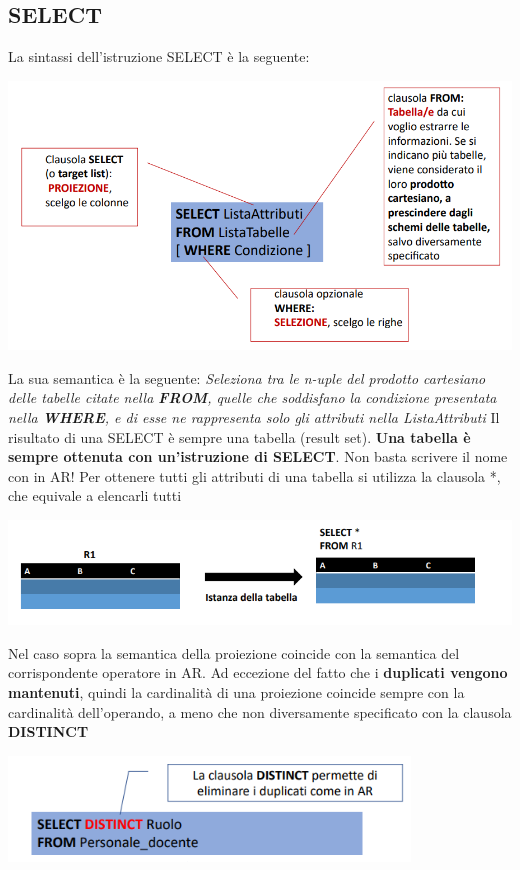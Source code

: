 \documentclass[12pt]{article}
\begin{document}
\subsection{SELECT}
La sintassi dell'istruzione SELECT è la seguente:
\begin{center}
    \includegraphics[width = 1\textwidth]{Images/168.PNG}
\end{center}
La sua semantica è la seguente: \textit{Seleziona tra le n-uple del prodotto cartesiano delle tabelle citate nella \textbf{FROM}, quelle che soddisfano la condizione presentata nella \textbf{WHERE}, e di esse ne rappresenta solo gli attributi nella \textit{ListaAttributi}}
Il risultato di una SELECT è sempre una tabella (result set).
\textbf{Una tabella è sempre ottenuta con un'istruzione di SELECT}. Non basta scrivere il nome con in AR!
Per ottenere tutti gli attributi di una tabella si utilizza la clausola *, che equivale a elencarli tutti
\begin{center}
    \includegraphics[width = 1\textwidth]{Images/169.PNG}
\end{center}
Nel caso sopra la semantica della proiezione coincide con la semantica del corrispondente operatore in AR.
Ad eccezione del fatto che i \textbf{duplicati vengono mantenuti}, quindi la cardinalità di una proiezione coincide sempre con la cardinalità dell'operando, a meno che non diversamente specificato con la clausola \textbf{DISTINCT}
\begin{center}
    \includegraphics[width = 0.80\textwidth]{Images/170.PNG}
\end{center}
\end{document}

